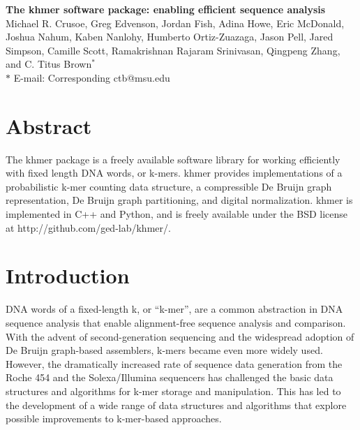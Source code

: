 \documentclass[10pt]{article}
\date{}
\begin{document}
\begin{flushleft}
{\Large
\textbf{The khmer software package: enabling efficient sequence analysis}
}
\\

Michael R. Crusoe, Greg Edvenson, Jordan Fish, Adina Howe, Eric McDonald, Joshua Nahum, Kaben Nanlohy, Humberto Ortiz-Zuazaga, Jason Pell, Jared Simpson, Camille Scott, Ramakrishnan Rajaram Srinivasan, Qingpeng Zhang, and C. Titus Brown$^{\ast}$
\\
$\ast$ E-mail: Corresponding ctb@msu.edu
\end{flushleft}

\section*{Abstract}

The khmer package is a freely available software library for working
efficiently with fixed length DNA words, or k-mers.  khmer provides
implementations of a probabilistic k-mer counting data structure,
a compressible De Bruijn graph representation, De Bruijn graph
partitioning, and digital normalization.  khmer is implemented in C++
and Python, and is freely available under the BSD license at http://github.com/ged-lab/khmer/.


\section*{Introduction}

DNA words of a fixed-length k, or ``k-mer'', are a common abstraction
in DNA sequence analysis that enable alignment-free sequence analysis
and comparison. With the advent of second-generation
sequencing and the widespread adoption of De Bruijn graph-based
assemblers, k-mers became even more widely used.  However, the
dramatically increased rate of sequence data generation from the Roche
454 and the Solexa/Illumina sequencers has challenged the basic
data structures and algorithms for k-mer storage and manipulation.
This has led to the development of a wide range of data structures and
algorithms that explore possible improvements to k-mer-based
approaches.
\end{document}
